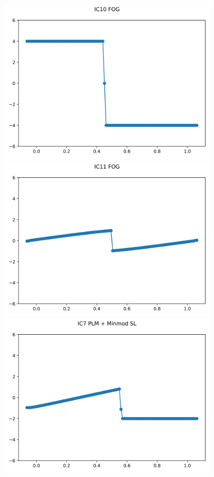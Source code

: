 \documentclass{article}
\begin{document}
\begin{figure}[t]
        \includegraphics[width=.95\textwidth]{../../code/hires_IC10Methodfu_plot.png}
        \includegraphics[width=.95\textwidth]{../../code/hires_IC11Methodfu_plot.png}
    \emp
        \centering
        \includegraphics[width=.95\textwidth]{../../code/hires_IC7Methodpm_plot.png}

\end{figure}
\end{document}
